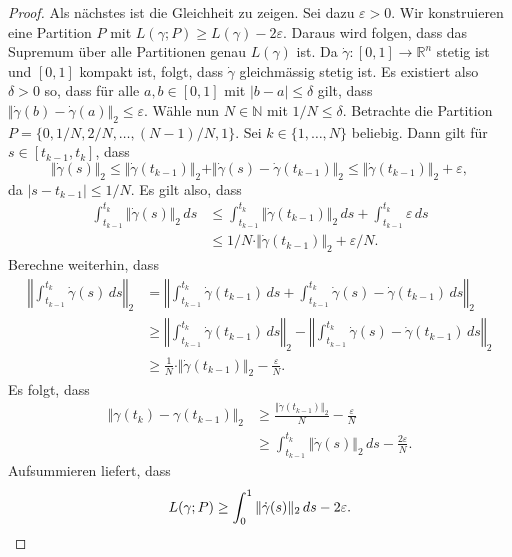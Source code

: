 \documentclass[../main.tex]{subfiles}
\begin{document}
\begin{proof}
  Als nächstes ist die Gleichheit zu zeigen.
  Sei dazu $\varepsilon > 0$.
  Wir konstruieren eine Partition
  $P$ mit $L(\gamma ; P) \geq L(\gamma) - 2\varepsilon$.
  Daraus wird folgen, dass das Supremum über alle Partitionen
  genau $L(\gamma)$ ist.
  Da $\dot \gamma \colon [0, 1] \to \mathbb{R}^n$ stetig ist
  und $[0, 1]$ kompakt ist, folgt, dass $\dot \gamma$ 
  gleichmässig stetig ist.
  Es existiert also $\delta > 0$ so, dass
  für alle $a, b \in [0, 1]$ mit $|b - a| \leq \delta$ 
  gilt, dass 
  $\Vert \dot \gamma(b) - \dot \gamma(a) \Vert_2 \leq \varepsilon$.
  Wähle nun $N \in \mathbb{N}$ mit $1/N \leq \delta$.
  Betrachte die Partition $P = \{0, 1/N, 2/N, \dots, (N-1)/N, 1\}$.
  Sei $k \in \{1, \dots, N\}$ beliebig.
  Dann gilt für $s \in [t_{k-1}, t_k]$, dass
  \[
  \Vert \dot \gamma(s) \Vert_2 \leq \Vert \dot \gamma
  (t_{k-1}) \Vert_2
  + \Vert \dot \gamma (s) - \dot \gamma(t_{k-1}) \Vert_2
  \leq \Vert \dot \gamma(t_{k-1}) \Vert_2 + \varepsilon,
  \]
  da $|s - t_{k-1}| \leq 1/N$.
  Es gilt also, dass
  \begin{align*}
       \int_{t_{k-1}}^{t_k} \Vert \dot \gamma (s) \Vert_2 \, ds 
       &\leq
    \int_{t_{k-1}}^{t_k} \Vert \dot \gamma(t_{k-1}) \Vert_2 \, ds
    + \int_{t_{k-1}}^{t_k} \varepsilon \, ds \\ 
       &\leq 1/N \cdot \Vert \dot \gamma(t_{k-1}) \Vert_2 + \varepsilon/N.
  \end{align*}
  Berechne weiterhin, dass
  \begin{align*}
    \left\Vert
    \int_{t_{k-1}}^{t_k} \dot \gamma(s) \, ds
    \right\Vert_2
    &=
    \left\Vert
    \int_{t_{k-1}}^{t_k} \dot \gamma(t_{k-1}) \, ds
    + \int_{t_{k-1}}^{t_k} \dot \gamma(s) - \dot \gamma(t_{k-1}) \, ds
    \right\Vert_2 \\
    &\geq
    \left\Vert
    \int_{t_{k-1}}^{t_k} \dot \gamma(t_{k-1}) \, ds
    \right\Vert_2
    -
    \left\Vert
    \int_{t_{k-1}}^{t_k} \dot \gamma(s) - \dot \gamma(t_{k-1}) \, ds
    \right\Vert_2 \\
    &\geq
    \frac{1}{N} \cdot \Vert \dot \gamma(t_{k-1}) \Vert_2 
    - \frac{\varepsilon}{N}.
  \end{align*}
  Es folgt, dass
  \begin{align*}
    \Vert \gamma(t_k) - \gamma(t_{k-1}) \Vert_2
    & \geq \frac{\Vert \dot \gamma(t_{k-1}) \Vert_2}{N}
    - \frac{\varepsilon}{N}\\
    &\geq \int_{t_{k-1}}^{t_k} \Vert \dot \gamma(s) \Vert_2 \, ds
    - \frac{2\varepsilon}{N}.
  \end{align*}
  Aufsummieren liefert, dass
  \[
    L(\gamma ; P) \geq \int_{0}^{1} \Vert \dot \gamma(s) \Vert_2 \, ds
    - 2 \varepsilon. \qedhere
  \]
\end{proof}
\end{document}
